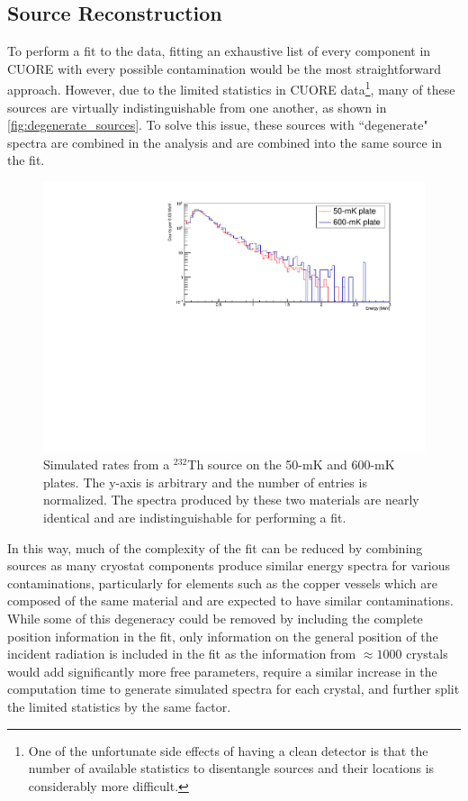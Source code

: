 \subsection*{Source Reconstruction}
To perform a fit to the data, fitting an exhaustive list of every component in CUORE with every possible contamination would be the most straightforward approach.
However, due to the limited statistics in CUORE data\footnote{One of the unfortunate side effects of having a clean detector is that the number of available statistics to disentangle sources and their locations is considerably more difficult.}, many of these sources are virtually indistinguishable from one another, as shown in \autoref{fig:degenerate_sources}.
To solve this issue, these sources with ``degenerate" spectra are combined in the analysis and are combined into the same source in the fit.
\begin{figure}[htbp]
    \centering
    \includegraphics[width=0.8\linewidth]{Figures/th232_copper_plates.pdf}
    \caption[Simulated rates from a $^{232}$Th source on the 50-mK and 600-mK plates.]
    {Simulated rates from a $^{232}$Th source on the 50-mK and 600-mK plates.
    The y-axis is arbitrary and the number of entries is normalized.
    The spectra produced by these two materials are nearly identical and are indistinguishable for performing a fit.}
    \label{fig:degenerate_sources}
\end{figure}
In this way, much of the complexity of the fit can be reduced by combining sources as many cryostat components produce similar energy spectra for various contaminations, particularly for elements such as the copper vessels which are composed of the same material and are expected to have similar contaminations.
While some of this degeneracy could be removed by including the complete position information in the fit, only information on the general position of the incident radiation is included in the fit as the information from $\approx1000$ crystals would add significantly more free parameters, require a similar increase in the computation time to generate simulated spectra for each crystal, and further split the limited statistics by the same factor.

